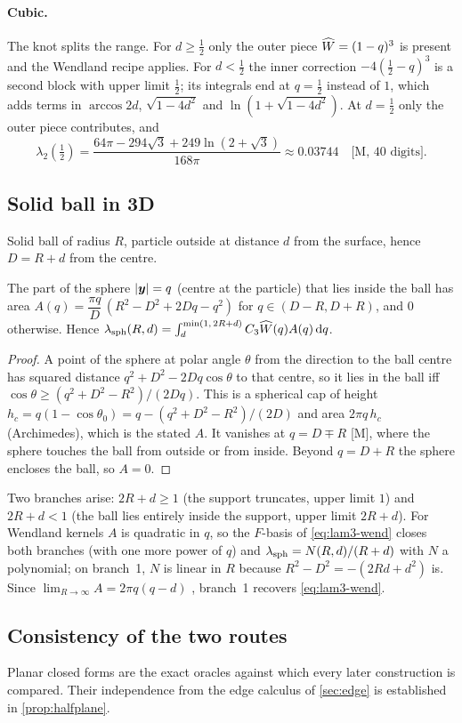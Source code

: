 \paragraph{Cubic.} The knot splits the range. For $d\ge\frac12$ only the outer piece $\widehat W=(1-q)^3$ is present and the
Wendland recipe applies. For $d<\frac12$ the inner correction $-4(\frac12-q)^3$ is a second block with upper limit
$\frac12$; its integrals end at $q=\frac12$ instead of $1$, which adds terms in $\arccos2d$, $\sqrt{1-4d^2}$ and
$\ln(1+\sqrt{1-4d^2})$. At $d=\frac12$ only the outer piece contributes, and
\[
 \lambda_2(\tfrac12)=\frac{64\pi-294\sqrt3+249\ln(2+\sqrt3)}{168\pi}\approx0.03744 \quad\text{[M, 40 digits]}.
\]

\subsection{Solid ball in 3D}\label{sec:sphere}
Solid ball of radius $R$, particle outside at distance $d$ from the surface, hence $D=R+d$ from the centre.
\begin{proposition}\label{prop:sphere}
The part of the sphere $|\bm y|=q$ (centre at the particle) that lies inside the ball has area
$A(q)=\dfrac{\pi q}{D}\,(R^2-D^2+2Dq-q^2)$ for $q\in(D-R,D+R)$, and $0$ otherwise.
Hence $\lambda_{\rm sph}(R,d)=\int_d^{\min(1,\,2R+d)}C_3\widehat W(q)A(q)\,\mathrm{d} q$. 
\end{proposition}
\begin{proof}
A point of the sphere at polar angle $\theta$ from the direction to the ball centre has squared distance
$q^2+D^2-2Dq\cos\theta$ to that centre, so it lies in the ball iff $\cos\theta\ge(q^2+D^2-R^2)/(2Dq)$. This is a spherical
cap of height $h_c=q(1-\cos\theta_0)=q-(q^2+D^2-R^2)/(2D)$ and area $2\pi q\,h_c$ (Archimedes), which is the stated
$A$. It vanishes at $q=D\mp R$ [M], where the sphere touches the ball from outside or from inside. Beyond $q=D+R$ the
sphere encloses the ball, so $A=0$.
\end{proof}
Two branches arise: $2R+d\ge1$ (the support truncates, upper limit $1$) and $2R+d<1$ (the ball lies entirely inside the support,
upper limit $2R+d$). For Wendland kernels $A$ is quadratic in $q$, so the $F$-basis of \cref{eq:lam3-wend} closes both
branches (with one more power of $q$) and $\lambda_{\rm sph}=N(R,d)/(R+d)$ with $N$ a polynomial; on branch~1, $N$ is linear in $R$ because
$R^2-D^2=-(2Rd+d^2)$ is. Since $\lim_{R\to\infty}A=2\pi q(q-d)$ , branch~1 recovers
\cref{eq:lam3-wend}.

\subsection{Consistency of the two routes}
Planar closed forms are the exact oracles against which every later construction is compared. Their
independence from the edge calculus of \cref{sec:edge} is established in \cref{prop:halfplane}.
